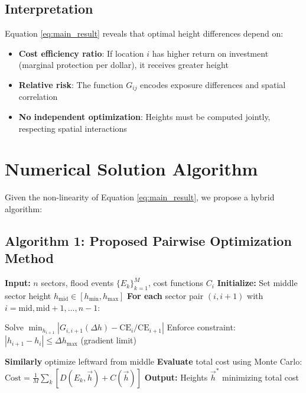 \documentclass[3p,twocolumn]{elsarticle}
\begin{document}
\subsection{Interpretation}

Equation \eqref{eq:main_result} reveals that optimal height differences depend on:
\begin{itemize}
  \item \textbf{Cost efficiency ratio}: If location $i$ has higher return on investment (marginal protection per dollar), it receives greater height
  \item \textbf{Relative risk}: The function $G_{ij}$ encodes exposure differences and spatial correlation
  \item \textbf{No independent optimization}: Heights must be computed jointly, respecting spatial interactions
\end{itemize}

\section{Numerical Solution Algorithm}

Given the non-linearity of Equation \eqref{eq:main_result}, we propose a hybrid algorithm:

\subsection{Algorithm 1: Proposed Pairwise Optimization Method}

\begin{algorithm}
\caption{Spatial Seawall Optimization via Pairwise Decomposition}
\begin{algorithmic}[1]
\State \textbf{Input:} $n$ sectors, flood events $\{E_k\}_{k=1}^{M}$, cost functions $C_i$
\State \textbf{Initialize:} Set middle sector height $h_{\text{mid}} \in [h_{\min}, h_{\max}]$
\State \textbf{For each} sector pair $(i, i+1)$ with $i = \text{mid}, \text{mid}+1, \ldots, n-1$:
  \begin{algorithmic}[2]
  \State Solve $\min_{h_{i+1}} |G_{i,i+1}(\Delta h) - \text{CE}_i / \text{CE}_{i+1}|$
  \State Enforce constraint: $|h_{i+1} - h_i| \leq \Delta h_{\max}$ (gradient limit)
  \end{algorithmic}
\State \textbf{Similarly} optimize leftward from middle
\State \textbf{Evaluate} total cost using Monte Carlo: $\text{Cost} = \frac{1}{M}\sum_{k} [D(E_k, \vec{h}) + C(\vec{h})]$
\State \textbf{Output:} Heights $\vec{h}^*$ minimizing total cost
\end{algorithmic}
\end{algorithm}
\end{document}
